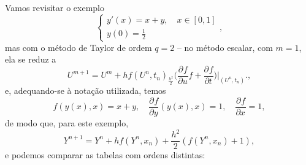 \documentclass[../differential_methods.tex]{subfiles}
\begin{document}
\begin{example}
	Vamos revisitar o exemplo
	\[
		\left\{\begin{array}{ll}
			y'(x) = x + y, \quad x\in [0, 1] \\
			y(0) = \frac{1}{2}
		\end{array}\right.,
	\]
	mas com o método de Taylor de ordem \(q=2\) -- no método escalar, com \(m=1\), ela se reduz a
	\[
		U^{m+1} = U^{m} + h f(U^{n}, t_{n}) _ \frac{h^{2}}{2}\biggl(\frac{\partial^{}f}{\partial u^{}}f + \frac{\partial^{}f}{\partial t^{}}\biggr)\biggl|_{(U^{n}, t_{n})}^{}\biggr.,
	\]
	e, adequando-se à notação utilizada, temos
	\[
		f(y(x), x) = x+y,\quad \frac{\partial^{}f}{\partial y^{}}(y(x), x) = 1,\quad \frac{\partial^{}f}{\partial x^{}} = 1,
	\]
	de modo que, para este exemplo,
	\[
		Y^{n+1} = Y^{n} + h f(Y^{n}, x_{n}) + \frac{h^{2}}{2}(f(Y^{n}, x_{n})+1),
	\]
	e podemos comparar as tabelas com ordens distintas:


\end{example}
\end{document}
